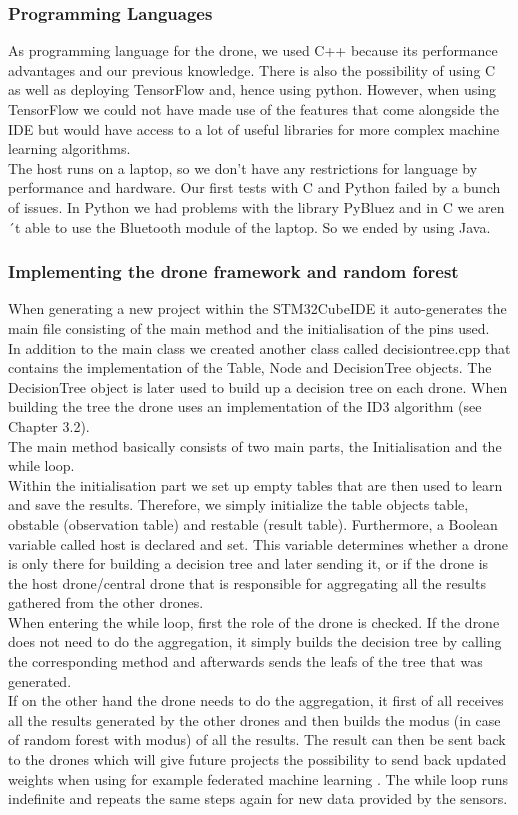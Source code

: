 \subsubsection*{Programming Languages}
As programming language for the drone, we used C++ because its performance advantages and our previous knowledge. There is also the possibility of using C as well as deploying TensorFlow and, hence using python. However, when using TensorFlow we could not have made use of the features that come alongside the IDE but would have access to a lot of useful libraries for more complex machine learning algorithms. \\
The host runs on a laptop, so we don’t have any restrictions for language by performance and hardware. Our first tests with C and Python failed by a bunch of issues. In Python we had problems with the library PyBluez and in C we aren´t able to use the Bluetooth module of the laptop. So we ended by using Java.

\subsubsection*{Implementing the drone framework and random forest}
When generating a new project within the STM32CubeIDE it auto-generates the main file consisting of the main method and the initialisation of the pins used. \\
In addition to the main class we created another class called decisiontree.cpp that contains the implementation of the Table, Node and DecisionTree objects. The DecisionTree object is later used to build up a decision tree on each drone. When building the tree the drone uses an implementation of the ID3 algorithm (see Chapter 3.2)\cite{BowTree}.\\
The main method basically consists of two main parts, the Initialisation and the while loop. \\
Within the initialisation part we set up empty tables that are then used to learn and save the results. Therefore, we simply initialize the table objects table, obstable (observation table) and restable (result table). Furthermore, a Boolean variable called host is declared and set. This variable determines whether a drone is only there for building a decision tree and later sending it, or if the drone is the host drone/central drone that is responsible for aggregating all the results gathered from the other drones. \\
When entering the while loop, first the role of the drone is checked. If the drone does not need to do the aggregation, it simply builds the decision tree by calling the corresponding method and afterwards sends the leafs of the tree that was generated. \\
If on the other hand the drone needs to do the aggregation, it first of all receives all the results generated by the other drones and then builds the modus (in case of random forest with modus) of all the results. The result can then be sent back to the drones which will give future projects the possibility to send back updated weights when using for example federated machine learning \cite{DBLP:journals/corr/abs-1908-07873}.
The while loop runs indefinite and repeats the same steps again for new data provided by the sensors. 

